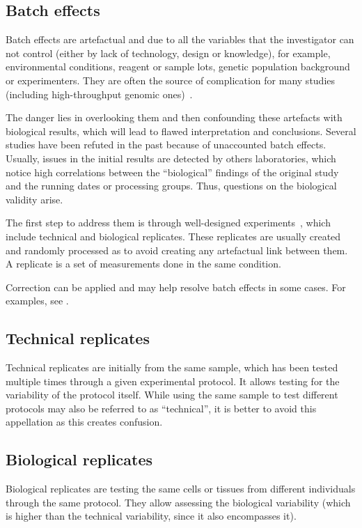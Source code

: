 \subsection{Batch effects}\label{sub:BatchEffect}

Batch effects are artefactual and due to all the variables
that the investigator can not control
(either by lack of technology, design or knowledge), for example,
environmental conditions, reagent or sample lots,
genetic population background or experimenters.
They are often the source of complication for many studies
(including high-throughput genomic ones)~.

The danger lies in overlooking them and then confounding these artefacts
with biological results, which will lead to flawed interpretation and conclusions.
Several studies have been refuted in the past because of unaccounted batch effects.
Usually, issues in the initial results are detected by others laboratories,
which notice high correlations between the \enquote{biological} findings
of the original study and the running dates or processing groups.
Thus, questions on the biological validity arise.

The first step to address them is through well-designed experiments~,
which include technical and biological replicates.
These replicates are usually created and randomly processed
as to avoid creating any artefactual link between them.
A replicate is a set of measurements done in the same condition.

Correction can be applied and may help resolve batch effects in some cases.
For examples, see \citet{Oytam2016-rb,Gagnon-Bartsch2012-dj,Peixoto2015-wg}.

\subsection{Technical replicates}
Technical replicates are initially from the same sample,
which has been tested multiple times through a given experimental protocol.
It allows testing for the variability of the protocol itself.
While using the same sample to test different protocols
may also be referred to as \enquote{technical},
it is better to avoid this appellation as this creates confusion.

\subsection{Biological replicates}
Biological replicates are testing the same cells or tissues from different individuals
through the same protocol.
They allow assessing the biological variability
(which is higher than the technical variability, since it also encompasses it).

